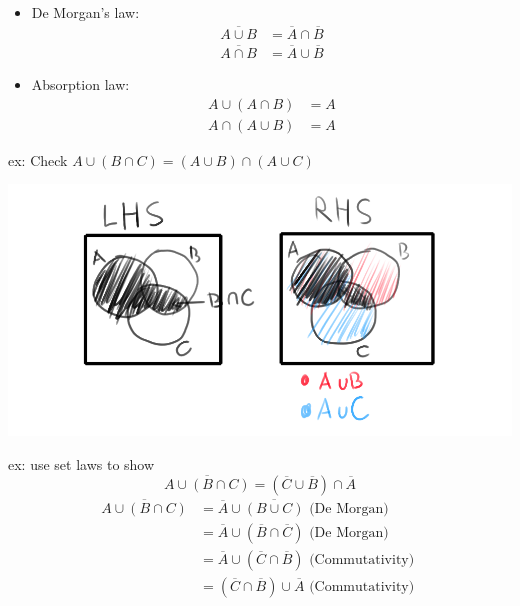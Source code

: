 \documentclass{article}
\begin{document}
\begin{itemize}
    \item De Morgan's law: \begin{align*}
              \overline{A \cup  B} & = \overline{A}\cap \overline{B}  \\
              \overline{A \cap B}  & = \overline{A}\cup  \overline{B}
          \end{align*}
    \item Absorption law: \begin{align*}
              A \cup (A \cap B) & = A \\
              A \cap (A \cup B) & = A
          \end{align*}
\end{itemize}
ex: Check $A \cup (B \cap C) = (A \cup B) \cap (A \cup C)$

\includegraphics{l2_2}

ex: use set laws to show
\[
    \overline{A \cup (B \cap C)} = (\overline{C}\cup \overline{B})\cap \overline{A}
\]
\begin{align*}
    \overline{A \cup (B \cap C)} & = \overline{A} \cup \overline{(B \cup C)} \text{ (De Morgan) }               \\
                                 & = \overline{A} \cup (\overline{B}\cap \overline{C}) \text{ (De Morgan) }     \\
                                 & = \overline{A} \cup (\overline{C}\cap \overline{B}) \text{ (Commutativity) } \\
                                 & = (\overline{C}\cap \overline{B}) \cup \overline{A} \text{ (Commutativity) }
\end{align*}
\end{document}
